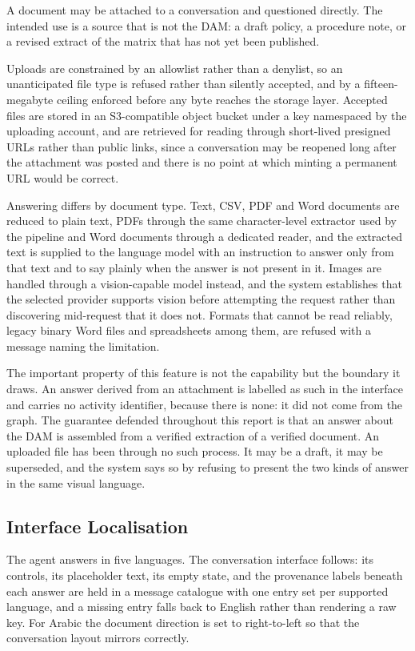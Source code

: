 A document may be attached to a conversation and questioned directly. The intended use is
a source that is not the DAM: a draft policy, a procedure note, or a revised extract of
the matrix that has not yet been published.

Uploads are constrained by an allowlist rather than a denylist, so an unanticipated file
type is refused rather than silently accepted, and by a fifteen-megabyte ceiling enforced
before any byte reaches the storage layer. Accepted files are stored in an S3-compatible
object bucket under a key namespaced by the uploading account, and are retrieved for
reading through short-lived presigned URLs rather than public links, since a conversation
may be reopened long after the attachment was posted and there is no point at which
minting a permanent URL would be correct.

Answering differs by document type. Text, CSV, PDF and Word documents are reduced to plain
text, PDFs through the same character-level extractor used by the pipeline and Word
documents through a dedicated reader, and the extracted text is supplied to the language
model with an instruction to answer only from that text and to say plainly when the answer
is not present in it. Images are handled through a vision-capable model instead, and the
system establishes that the selected provider supports vision before attempting the
request rather than discovering mid-request that it does not. Formats that cannot be read
reliably, legacy binary Word files and spreadsheets among them, are refused with a message
naming the limitation.

The important property of this feature is not the capability but the boundary it draws.
An answer derived from an attachment is labelled as such in the interface and carries no
activity identifier, because there is none: it did not come from the graph. The guarantee
defended throughout this report is that an answer about the DAM is assembled from a
verified extraction of a verified document. An uploaded file has been through no such
process. It may be a draft, it may be superseded, and the system says so by refusing to
present the two kinds of answer in the same visual language.

\subsection{Interface Localisation}

The agent answers in five languages. The conversation interface follows: its controls, its
placeholder text, its empty state, and the provenance labels beneath each answer are held
in a message catalogue with one entry set per supported language, and a missing entry
falls back to English rather than rendering a raw key. For Arabic the document direction
is set to right-to-left so that the conversation layout mirrors correctly.

